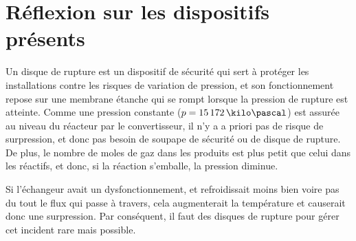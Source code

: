 \section{Réflexion sur les dispositifs présents}
Un disque de rupture est un dispositif de sécurité qui sert à protéger les installations contre les risques de variation de pression, et son fonctionnement repose sur une membrane étanche qui se rompt lorsque la pression de rupture est atteinte. \cite{disque}
Comme une pression constante ($p=15\,172\,\kilo\pascal$) est assurée au niveau du réacteur par le convertisseur, il n'y a a priori pas de risque de surpression, et donc pas besoin de soupape de sécurité ou de disque de rupture.
De plus, le nombre de moles de gaz dans les produits est plus petit que celui dans les réactifs, et donc, si la réaction s'emballe, la pression diminue.

Si l'échangeur avait un dysfonctionnement,
et refroidissait moins bien voire pas du tout le flux qui passe à travers,
cela augmenterait la température et causerait donc une surpression.
Par conséquent, il faut des disques de rupture pour gérer cet incident
rare mais possible.
